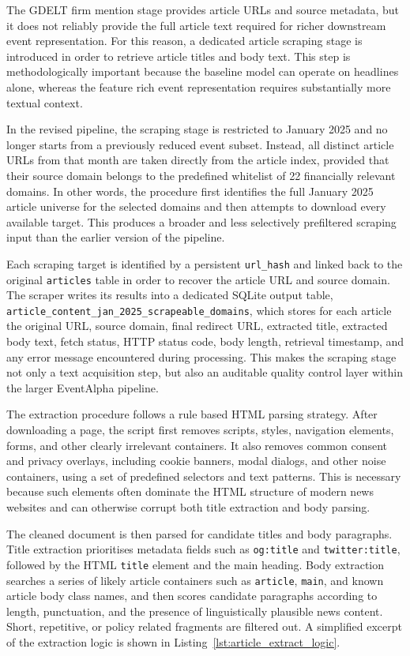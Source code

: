 The GDELT firm mention stage provides article URLs and source metadata, but it does not reliably provide the full article text required for richer downstream event representation. For this reason, a dedicated article scraping stage is introduced in order to retrieve article titles and body text. This step is methodologically important because the baseline model can operate on headlines alone, whereas the feature rich event representation requires substantially more textual context.

In the revised pipeline, the scraping stage is restricted to January 2025 and no longer starts from a previously reduced event subset. Instead, all distinct article URLs from that month are taken directly from the article index, provided that their source domain belongs to the predefined whitelist of 22 financially relevant domains. In other words, the procedure first identifies the full January 2025 article universe for the selected domains and then attempts to download every available target. This produces a broader and less selectively prefiltered scraping input than the earlier version of the pipeline.

Each scraping target is identified by a persistent \texttt{url\_hash} and linked back to the original \texttt{articles} table in order to recover the article URL and source domain. The scraper writes its results into a dedicated SQLite output table, \texttt{article\_content\_jan\_2025\_scrapeable\_domains}, which stores for each article the original URL, source domain, final redirect URL, extracted title, extracted body text, fetch status, HTTP status code, body length, retrieval timestamp, and any error message encountered during processing. This makes the scraping stage not only a text acquisition step, but also an auditable quality control layer within the larger EventAlpha pipeline.

The extraction procedure follows a rule based HTML parsing strategy. After downloading a page, the script first removes scripts, styles, navigation elements, forms, and other clearly irrelevant containers. It also removes common consent and privacy overlays, including cookie banners, modal dialogs, and other noise containers, using a set of predefined selectors and text patterns. This is necessary because such elements often dominate the HTML structure of modern news websites and can otherwise corrupt both title extraction and body parsing.

The cleaned document is then parsed for candidate titles and body paragraphs. Title extraction prioritises metadata fields such as \texttt{og:title} and \texttt{twitter:title}, followed by the HTML \texttt{title} element and the main heading. Body extraction searches a series of likely article containers such as \texttt{article}, \texttt{main}, and known article body class names, and then scores candidate paragraphs according to length, punctuation, and the presence of linguistically plausible news content. Short, repetitive, or policy related fragments are filtered out. A simplified excerpt of the extraction logic is shown in Listing~\ref{lst:article_extract_logic}.

